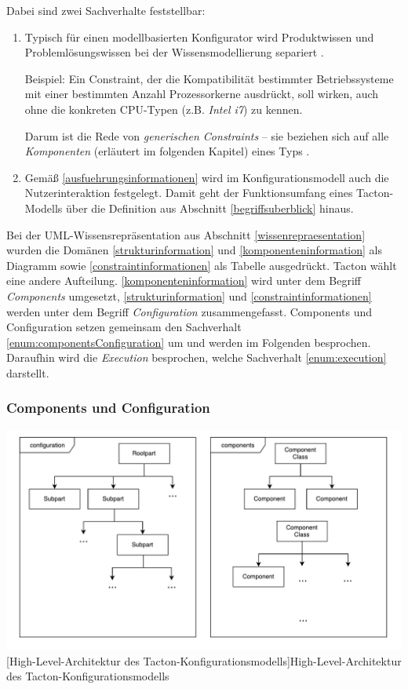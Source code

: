 \documentclass[11pt, a4paper, titlepage, listof=totoc, bibliography=totoc, index=totoc, twoside, openright, headings=normal]{scrreprt}
\begin{document}
Dabei sind zwei Sachverhalte feststellbar:
\begin{enumerate}[(1)]
\item \label{enum:componentsConfiguration} Typisch für einen modellbasierten Konfigurator wird Produktwissen und Problemlösungswissen bei der Wissensmodellierung separiert \citep{felferning14}.

Beispiel: Ein Constraint, der die Kompatibilität bestimmter Betriebssysteme mit einer bestimmten Anzahl Prozessorkerne ausdrückt, soll wirken, auch ohne die konkreten CPU-Typen (z.B. \emph{Intel i7}) zu kennen.

Darum ist die Rede von \emph{generischen Constraints} -- sie beziehen sich auf alle \emph{Komponenten} (erläutert im folgenden Kapitel) eines Typs \citep{felferning14}.
\item \label{enum:execution} Gemäß \eqref{ausfuehrungsinformationen} wird im Konfigurationsmodell auch die Nutzerinteraktion festgelegt. Damit geht der Funktionsumfang eines Tacton-Modells über die Definition aus Abschnitt \ref{begriffsuberblick} hinaus.
\end{enumerate}

Bei der UML-Wissensrepräsentation aus Abschnitt \ref{wissenrepraesentation} wurden die Domänen  \eqref{strukturinformation} und \eqref{komponenteninformation} als Diagramm sowie \eqref{constraintinformationen} als Tabelle ausgedrückt. Tacton wählt eine andere Aufteilung. \eqref{komponenteninformation} wird unter dem Begriff  \emph{Components} umgesetzt, \eqref{strukturinformation} und \eqref{constraintinformationen} werden unter dem Begriff \emph{Configuration} zusammengefasst. Components und Configuration setzen gemeinsam den Sachverhalt \eqref{enum:componentsConfiguration} um und werden im Folgenden besprochen. Daraufhin wird die \emph{Execution} besprochen, welche Sachverhalt \eqref{enum:execution} darstellt.


\subsubsection{Components und Configuration}

\vspace{1em}
\begin{minipage}{\linewidth}
	\centering
	\includegraphics[width=0.75\linewidth]{Abbildungen/tactonModellHighLevel.pdf}
	[High-Level-Architektur des Tacton-Konfigurationsmodells]{High-Level-Architektur des Tacton-Konfigurationsmodells}
	\label{fig:tactonModellHighLevel}
\end{minipage}
\vspace{0.3em}
\end{document}
